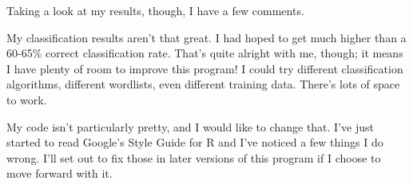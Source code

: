 \documentclass[12pt]{report}
\begin{document}
Taking a look at my results, though, I have a few comments.

My classification results aren’t that great. I had hoped to get much higher than a 60-65\% correct classification rate. That’s quite alright with me, though; it means I have plenty of room to improve this program! I could try different classification algorithms, different wordlists, even different training data. There’s lots of space to work.

My code isn’t particularly pretty, and I would like to change that. I’ve just started to read Google’s Style Guide for R and I’ve noticed a few things I do wrong. I’ll set out to fix those in later versions of this program if I choose to move forward with it.

\newpage

\end{document}
